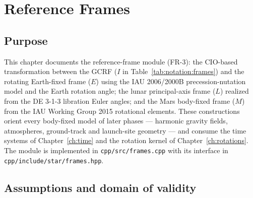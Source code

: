\chapter{Reference Frames}
\label{ch:frames}

\section{Purpose}
\label{sec:frames:purpose}

This chapter documents the reference-frame module (FR-3): the CIO-based
transformation between the GCRF ($I$ in
Table~\ref{tab:notation:frames}) and the rotating Earth-fixed frame ($E$)
using the IAU 2006/2000B precession-nutation model and the Earth rotation
angle; the lunar principal-axis frame ($L$) realized from the DE 3-1-3
libration Euler angles; and the Mars body-fixed frame ($M$) from the IAU
Working Group 2015 rotational elements. These constructions orient every
body-fixed model of later phases --- harmonic gravity fields, atmospheres,
ground-track and launch-site geometry --- and consume the time systems of
Chapter~\ref{ch:time} and the rotation kernel of
Chapter~\ref{ch:rotations}. The module is implemented in
\texttt{cpp/src/frames.cpp} with its interface in
\texttt{cpp/include/star/frames.hpp}.

\section{Assumptions and domain of validity}
\label{sec:frames:domain}

